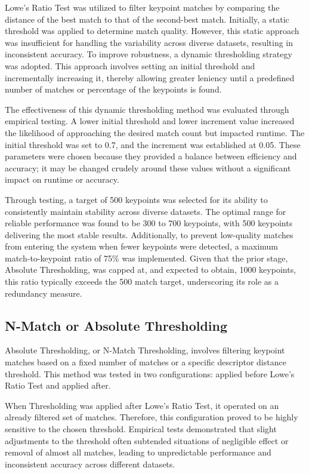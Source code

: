 Lowe's Ratio Test was utilized to filter keypoint matches by comparing the distance of the best match to that of the second-best match. Initially, a static threshold was applied to determine match quality. However, this static approach was insufficient for handling the variability across diverse datasets, resulting in inconsistent accuracy. To improve robustness, a dynamic thresholding strategy was adopted. This approach involves setting an initial threshold and incrementally increasing it, thereby allowing greater leniency until a predefined number of matches or percentage of the keypoints is found.

The effectiveness of this dynamic thresholding method was evaluated through empirical testing. A lower initial threshold and lower increment value increased the likelihood of approaching the desired match count but impacted runtime. The initial threshold was set to 0.7, and the increment was established at 0.05. These parameters were chosen because they provided a balance between efficiency and accuracy; it may be changed crudely around these values without a significant impact on runtime or accuracy. 

Through testing, a target of 500 keypoints was selected for its ability to consistently maintain stability across diverse datasets. The optimal range for reliable performance was found to be 300 to 700 keypoints, with 500 keypoints delivering the most stable results. Additionally, to prevent low-quality matches from entering the system when fewer keypoints were detected, a maximum match-to-keypoint ratio of 75\% was implemented. Given that the prior stage, Absolute Thresholding, was capped at, and expected to obtain, 1000 keypoints, this ratio typically exceeds the 500 match target, underscoring its role as a redundancy measure.
 

\subsection{N-Match or Absolute Thresholding}

Absolute Thresholding, or N-Match Thresholding, involves filtering keypoint matches based on a fixed number of matches or a specific descriptor distance threshold. This method was tested in two configurations: applied before Lowe's Ratio Test and applied after.

When Thresholding was applied after Lowe's Ratio Test, it operated on an already filtered set of matches. Therefore, this configuration proved to be highly sensitive to the chosen threshold. Empirical tests demonstrated that slight adjustments to the threshold often subtended situations of negligible effect or removal of almost all matches, leading to unpredictable performance and inconsistent accuracy across different datasets.

